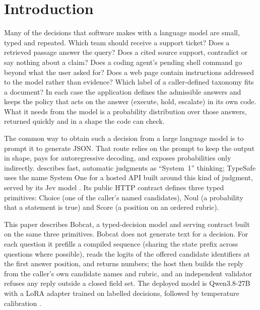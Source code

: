 \section{Introduction}
\label{sec:intro}

Many of the decisions that software makes with a language model are small, typed and
repeated. Which team should receive a support ticket? Does a retrieved passage answer the
query? Does a cited source support, contradict or say nothing about a claim? Does a coding
agent's pending shell command go beyond what the user asked for? Does a web page contain
instructions addressed to the model rather than evidence? Which label of a caller-defined
taxonomy fits a document? In each case the application defines the admissible answers and
keeps the policy that acts on the answer (execute, hold, escalate) in its own code. What it
needs from the model is a probability distribution over those answers, returned quickly and
in a shape the code can check.

The common way to obtain such a decision from a large language model is to prompt it to
generate JSON. That route relies on the prompt to keep the output in shape, pays for
autoregressive decoding, and exposes probabilities only indirectly. \citet{kahneman2011}
describes fast, automatic judgments as ``System~1'' thinking; TypeSafe uses the name System
One for a hosted API built around this kind of judgment, served by its Jev model
\citep{typesafe_blog,typesafe_api}. Its public HTTP contract defines three typed primitives:
Choice (one of the caller's named candidates), Noul (a probability that a statement is true)
and Score (a position on an ordered rubric).

This paper describes Bobcat, a typed-decision model and serving contract built on the same
three primitives. Bobcat does not generate text for a decision. For each question it prefills a
compiled sequence (sharing the state prefix across questions where possible), reads the logits of the offered candidate identifiers at
the first answer position, and returns numbers; the host then builds the reply from the
caller's own candidate names and rubric, and an independent validator refuses any reply
outside a closed field set. The deployed model is Qwen3.8-27B \citep{qwen38_27b} with a
LoRA adapter \citep{hu2021lora} trained on labelled decisions, followed by temperature
calibration \citep{guo2017calibration}.

